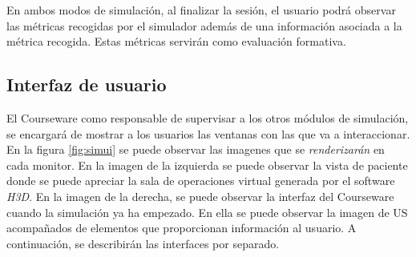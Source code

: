 En ambos modos de simulación, al finalizar la sesión, el usuario podrá observar las métricas recogidas por el simulador además de una información asociada a la métrica recogida. Estas métricas servirán como evaluación formativa.






\subsection{Interfaz de usuario}
\label{course:ui}
El \ac{Courseware} como responsable de supervisar a los otros módulos de simulación, se encargará de mostrar a los usuarios las ventanas con las que va a interaccionar. En la figura \ref{fig:simui} se puede observar las imagenes que se \emph{renderizarán} en cada monitor. En la imagen de la izquierda se puede observar la vista de paciente donde se puede apreciar la sala de operaciones virtual generada por el software \emph{H3D}. En la imagen de la derecha, se puede observar la interfaz del \ac{Courseware} cuando la simulación ya ha empezado. En ella se puede observar la imagen de \ac{US} acompañados de elementos que proporcionan información al usuario. A continuación, se describirán las interfaces por separado.


